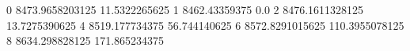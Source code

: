 0 8473.9658203125 11.5322265625
1 8462.43359375 0.0
2 8476.1611328125 13.7275390625
4 8519.177734375 56.744140625
6 8572.8291015625 110.3955078125
8 8634.298828125 171.865234375
